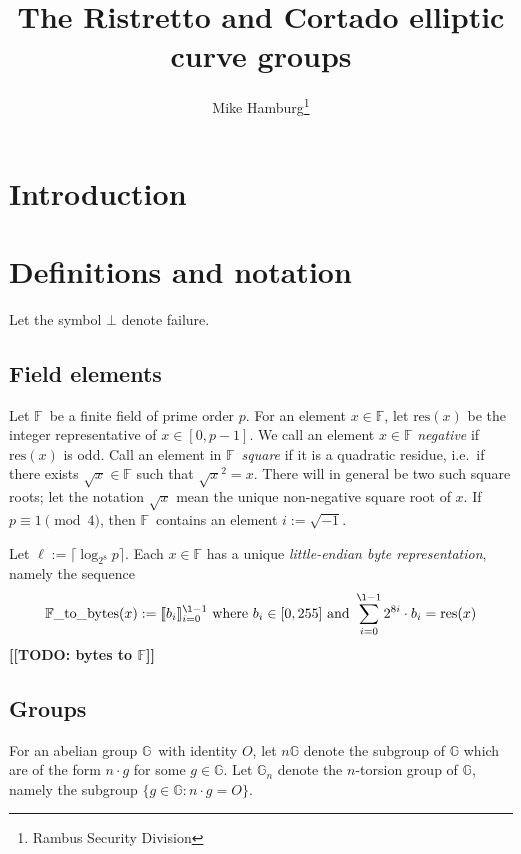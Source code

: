 \documentclass[11pt]{article}
\newcommand\todo[1]{\textbf{[[TODO: #1]]}\xspace}
\def\F{\ensuremath{\mathbb{F}}}
\def\G{\ensuremath{\mathbb{G}}}
\def\O{\ensuremath{O}}
\begin{document}
\title{The Ristretto and Cortado elliptic curve groups}
\author{Mike Hamburg\thanks{Rambus Security Division}}
\maketitle

\begin{abstract}
\end{abstract}

\section{Introduction}
\section{Definitions and notation}

Let the symbol $\bot$ denote failure.

\subsection{Field elements}
Let \F\ be a finite field of prime order $p$.  For an element $x\in\F$, let $\text{res}(x)$ be the integer representative of $x\in[0,p-1]$.  We call an element $x\in\F$ \textit{negative} if $\text{res}(x)$ is odd.  Call an element in \F\ \textit{square} if it is a quadratic residue, i.e.\ if there exists $\sqrt{x}\in\F$ such that $\sqrt{x}^2=x$.  There will in general be two such square roots; let the notation $\sqrt{x}$ mean the unique non-negative square root of $x$.  If $p\equiv1\pmod 4$, then \F\ contains an element $i := \sqrt{-1}$.

Let $\ell := \lceil \log_{2^8} p\rceil$.  Each $x\in\F$ has a unique \textit{little-endian byte representation}, namely the sequence
$$
\text{\F\_to\_bytes}(x) := \llbracket b_i\rrbracket_{i=0}^{\l-1} \ \text{where}\ b_i\in[0,255]\text{\ and\ }\sum_{i=0}^{\l-1} 2^{8i} \cdot b_i = \text{res}(x)
$$
\todo{bytes to \F}

\subsection{Groups}
For an abelian group \G\ with identity \O, let $n\G$ denote the subgroup of $\G$ which are of the form $n\cdot g$ for some $g\in\G$.  Let $\G_n$ denote the $n$-torsion group of \G, namely the subgroup $\{g\in\G : n\cdot g = O\}$.
\end{document}
